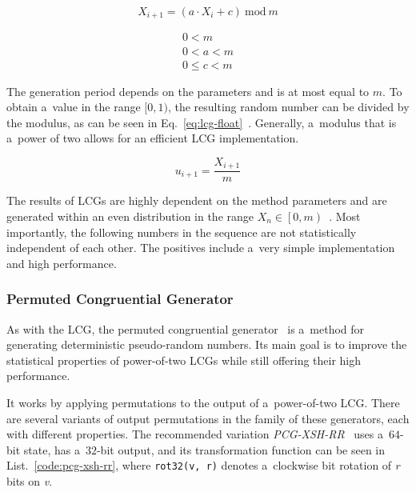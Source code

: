 \begin{equation}\label{eq:lcg}
    X_{i+1} = \left( a \cdot X_i + c \right)~\text{mod}~m
\end{equation}

\begin{equation}\label{eq:lcg-ranges}
\begin{aligned}
    0 < m \\
    0 < a < m \\
    0 \leq c < m
\end{aligned}
\end{equation}

The generation period depends on the parameters and is at most equal to $m$. To obtain a~value in the range $[0, 1)$, the resulting random number can be divided by the modulus, as can be seen in Eq.~\ref{eq:lcg-float}~\cite{linear-congruential-generators-tezuka}.  Generally, a~modulus that is a~power of two allows for an efficient LCG implementation.

\begin{equation}\label{eq:lcg-float}
    u_{i+1} = \frac{X_{i+1}}{m}
\end{equation}

The results of LCGs are highly dependent on the method parameters and are generated within an even distribution in the range $X_n \in \left[0, m\right)$~\cite{peringer-hruby-ims}. Most importantly, the following numbers in the sequence are not statistically independent of each other. The positives include a~very simple implementation and high performance.

\subsubsection*{Permuted Congruential Generator}
As with the LCG, the permuted congruential generator~\cite{oneill:pcg2014} is a~method for generating deterministic pseudo-random numbers. Its main goal is to improve the statistical properties of power-of-two LCGs while still offering their high performance.

It works by applying permutations to the output of a~power-of-two LCG. There are several variants of output permutations in the family of these generators, each with different properties. The recommended variation \emph{PCG-XSH-RR}~\cite{oneill:pcg2014} uses a~$64$-bit state, has a~$32$-bit output, and its transformation function can be seen in List.~\ref{code:pcg-xsh-rr}, where \texttt{rot32(v, r)} denotes a~clockwise bit rotation of \emph{r} bits on \emph{v}.

